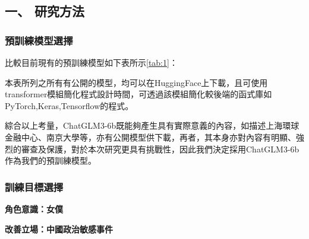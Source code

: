 \documentclass[12pt,a4paper,Times New Roman,UTF8,natbib]{article}
\begin{document}
\begin{CJK*}{UTF8}{bsmi}
	\subsection{一、 研究方法}
	\subsubsection{預訓練模型選擇}
	比較目前現有的預訓練模型如下表所示\ref{tab:1}：
	\begin{table}[H]
	\caption{表一、比較及評估預訓練模型}
	\label{tab:1}
	\end{table}
	本表所列之所有有公開的模型，均可以在HuggingFace上下載，且可使用transformer模組簡化程式設計時間，可透過該模組簡化較後端的函式庫如PyTorch,Keras,Tensorflow的程式。
	
	綜合以上考量，ChatGLM3-6b既能夠產生具有實際意義的內容，如描述上海環球金融中心、南京大學等，亦有公開模型供下載，再者，其本身亦對內容有明顯、強烈的審查及保護，對於本次研究更具有挑戰性，因此我們決定採用ChatGLM3-6b作為我們的預訓練模型。
	
	\subsubsection{訓練目標選擇}
	\textbf{角色意識：女僕}
	
	\textbf{改善立場：中國政治敏感事件}
	

\end{CJK*}
\end{document}
